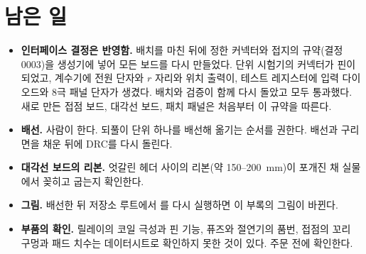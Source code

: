 
\section{남은 일}

\begin{itemize}
\item \textbf{인터페이스 결정은 반영함.} 배치를 마친 뒤에 정한 커넥터와 접지의 규약(결정 0003)을 생성기에 넣어 모든
보드를 다시 만들었다. 단위 시험기의 커넥터가 핀이 되었고, 계수기에 전원 단자와 $r$ 자리와 위치 출력이, 테스트
레지스터에 입력 다이오드와 8극 패널 단자가 생겼다. 배치와 검증이 함께 다시 돌았고 모두 통과했다. 새로 만든 접점
보드, 대각선 보드, 패치 패널은 처음부터 이 규약을 따른다.
\item \textbf{배선.} 사람이 한다. 되풀이 단위 하나를 배선해 옮기는 순서를 권한다. 배선과 구리면을 채운 뒤에
DRC를 다시 돌린다.
\item \textbf{대각선 보드의 리본.} 엇갈린 헤더 사이의 리본(약 150--200~mm)이 포개진 채 실물에서 꽂히고 굽는지 확인한다.
\item \textbf{그림.} 배선한 뒤 저장소 루트에서 를 다시 실행하면 이 부록의
그림이 바뀐다.
\item \textbf{부품의 확인.} 릴레이의 코일 극성과 핀 기능, 퓨즈와 절연기의 품번, 접점의 꼬리 구멍과 패드 치수는
데이터시트로 확인하지 못한 것이 있다. 주문 전에 확인한다.
\end{itemize}
